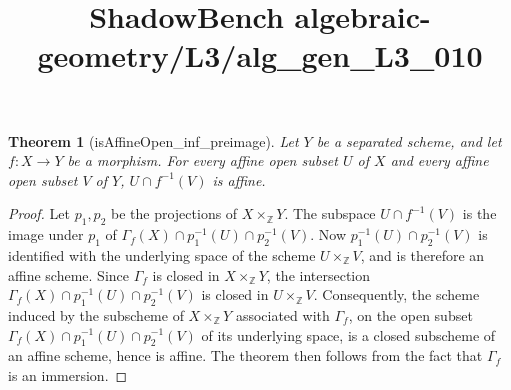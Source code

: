 \documentclass{article}
\title{ShadowBench algebraic-geometry/L3/alg\_gen\_L3\_010}
\newtheorem{theorem}{Theorem}
\begin{document}
\maketitle

\begin{theorem}[isAffineOpen_inf_preimage]
Let \(Y\) be a separated scheme, and let \(f:X\to Y\) be a morphism. For every affine open subset \(U\) of \(X\) and every affine open subset \(V\) of \(Y\), \(U\cap f^{-1}(V)\) is affine.
\end{theorem}

\begin{proof}
Let \(p_1,p_2\) be the projections of \(X\times_{\mathbb Z}Y\). The subspace \(U\cap f^{-1}(V)\) is the image under \(p_1\) of \(\Gamma_f(X)\cap p_1^{-1}(U)\cap p_2^{-1}(V)\). Now \(p_1^{-1}(U)\cap p_2^{-1}(V)\) is identified with the underlying space of the scheme \(U\times_{\mathbb Z}V\), and is therefore an affine scheme. Since \(\Gamma_f\) is closed in
\(X\times_{\mathbb Z}Y\), the intersection \(\Gamma_f(X)\cap p_1^{-1}(U)\cap p_2^{-1}(V)
\) is closed in \(U\times_{\mathbb Z}V\). Consequently, the scheme induced by the subscheme of \(X\times_{\mathbb Z}Y\) associated with \(\Gamma_f\), on the open subset \(\Gamma_f(X)\cap p_1^{-1}(U)\cap p_2^{-1}(V)\) of its underlying space, is a closed subscheme of an affine scheme, hence is affine. The theorem then follows from the fact that \(\Gamma_f\) is an immersion.
\end{proof}
\end{document}
